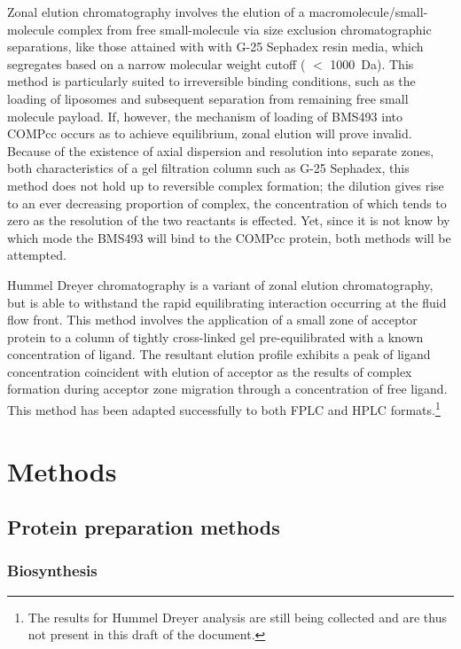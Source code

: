 \begin{refsection}
Zonal elution chromatography involves the elution of a
macromolecule/small-molecule complex from free small-molecule via size exclusion
chromatographic separations, like those attained with with G-25 Sephadex resin
media, which segregates based on a narrow molecular weight cutoff ( ${<}$
\SI{1000}{\dalton}). This method is particularly suited to irreversible binding
conditions, such as the loading of liposomes and subsequent separation from
remaining free small molecule payload.\cite{Pan2012,Wang2013} If, however, the
mechanism of loading of BMS493 into COMPcc occurs as to achieve equilibrium,
zonal elution will prove invalid. Because of the existence of axial dispersion
and resolution into separate zones, both characteristics of a gel filtration
column such as G-25 Sephadex, this method does not hold up to reversible complex
formation; the dilution gives rise to an ever decreasing proportion of complex,
the concentration of which tends to zero as the resolution of the two reactants
is effected.\cite{Winzor2001} Yet, since it is not know by which mode the BMS493
will bind to the COMPcc protein, both methods will be attempted.
 
Hummel Dreyer chromatography is a variant of zonal elution chromatography, but
is able to withstand the rapid equilibrating interaction occurring at the fluid flow
front. This method involves the application of a small zone of acceptor protein
to a column of tightly cross-linked gel pre-equilibrated with a known
concentration of ligand.\cite{Hummel1962} The resultant elution profile exhibits
a peak of ligand concentration coincident with elution of acceptor as the
results of complex formation during acceptor zone migration through a
concentration of free ligand. This method has been adapted successfully to both
FPLC and HPLC formats.\cite{Bieri1998}\footnote{The results for Hummel Dreyer
    analysis are still being collected and are thus not present in this draft of
the document.}

\section{Methods}

\subsection{Protein preparation methods}

\subsubsection{Biosynthesis}


\end{refsection}
